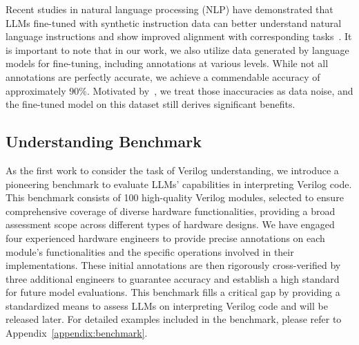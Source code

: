 Recent studies in natural language processing (NLP) have demonstrated that LLMs fine-tuned with synthetic instruction data can better understand natural language instructions and show improved alignment with corresponding tasks~\citep{wang2022self,ouyang2022training,taori2023stanford}.
It is important to note that in our work, we also utilize data generated by language models for fine-tuning, including annotations at various levels. While not all annotations are perfectly accurate, we achieve a commendable accuracy of approximately $90\%$. Motivated by~\citet{wang2022self}, we treat those inaccuracies as data noise, and the fine-tuned model on this dataset still derives significant benefits.

\subsection{Understanding Benchmark}
\label{sec:understanding_benchmark}
As the first work to consider the task of Verilog understanding, we introduce a pioneering benchmark to evaluate LLMs' capabilities in interpreting Verilog code. This benchmark consists of 100 high-quality Verilog modules, selected to ensure comprehensive coverage of diverse hardware functionalities, providing a broad assessment scope across different types of hardware designs. We have engaged four experienced hardware engineers to provide precise annotations on each module’s functionalities and the specific operations involved in their implementations. These initial annotations are then rigorously cross-verified by three additional engineers to guarantee accuracy and establish a high standard for future model evaluations. This benchmark fills a critical gap by providing a standardized means to assess LLMs on interpreting Verilog code and will be released later. For detailed examples included in the benchmark, please refer to Appendix~\ref{appendix:benchmark}.
